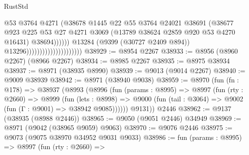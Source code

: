 \begin{lexlean}{RustStd}
\begin{coremodule}
                                                      @53
                                                      @3764
                                                      @4271
                                                      (@38678
                                                        @1445
                                                        @22
                                                        @55
                                                        @3764
                                                        @24021
                                                        @38691
                                                        (@38677
                                                          @923
                                                          @225
                                                          @53
                                                          @27
                                                          @4271
                                                          @3069
                                                          (@13789
                                                            @38624
                                                            @2859
                                                            @920
                                                            @53
                                                            @4270
                                                            @16431)
                                                          @38694))))))
                                              @13284
                                              (@9399 (@30727 @2409 @894))
                                              @13296)))))))))))))))))))))
@38929 := @8954 @2267
@38933 := @8956 (@8960 @2267) (@8966 @2267)
@38934 := @8985 @2267
@38935 := @8975 @38934
@38937 := @8971 (@38935 @8990)
@38939 := @9013 (@9014 @2267)
@38940 := @9009 @38939
@38942 := @8971 (@38940 @9038)
@38959 := @8970
    (fun (fn : @178) =>
    @38937
      (@8993
        (@8996
          (fun (params : @8995) =>
          @8997
            (fun (rty : @2660) =>
            @8999
              (fun (lets : @8998) =>
              @9000 (fun (tail : @3064) => @9002 (fun (Γ : @9001) => @38942 @9085))))))
        @9131))
    @2446
@38962 := @9137 (@38935 (@8988 @2446))
@38965 := @9050 (@9051 @2446) @34949
@38969 := @8971 (@9042 (@38965 @9059) @9063)
@38970 := @9076 @2446
@38975 := @9073 (@9075 @38970 @34952 @9031 @9033)
@38986 := fun (params : @8995) =>
  @8997
    (fun (rty : @2660) =>

\end{coremodule}
\end{lexlean}
